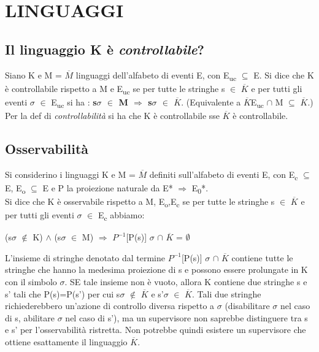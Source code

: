 \documentclass[a4paper]{article}
\begin{document}
\section{LINGUAGGI}
\subsection{Il linguaggio K è \emph{controllabile}?}
Siano K e M = $\overline{M}$ linguaggi dell'alfabeto di eventi E, con E\textsubscript{uc} $\subseteq$ E. Si dice che K è controllabile rispetto a M e E\textsubscript{uc} se per tutte le stringhe s $\in$ $\overline{K}$ e per tutti gli eventi $\sigma$ $\in$ E\textsubscript{uc} si ha : \textbf{s$\sigma$ $\in$ M $\Rightarrow$ s$\sigma$ $\in$ $\overline{K}$}. (Equivalente a $\overline{K}$E\textsubscript{uc} $\cap$ M $\subseteq$ $\overline{K}$.)\\ Per la def di \emph{controllabilità} si ha che K è controllabile sse $\overline{K}$ è controllabile.
\subsection{Osservabilità}
Si considerino i linguaggi K e M = $\overline{M}$ definiti sull'alfabeto di eventi E, con E\textsubscript{c} $\subseteq$ E, E\textsubscript{o} $\subseteq$ E e P la proiezione naturale da E* $\Rightarrow$ E\textsubscript{0}*.\\ Si dice che K è osservabile rispetto a M, E\textsubscript{o},E\textsubscript{c} se per tutte le stringhe s $\in$ $\overline{K}$ e per tutti gli eventi $\sigma$ $\in$ E\textsubscript{c} abbiamo: 
\begin{center}(s$\sigma$ $\notin$ K) $\land$ (s$\sigma$ $\in$ M) $\Rightarrow$ $P^{-1}$[P(s)] $\sigma$  $\cap$ $\overline{K}$ = $\emptyset$
\end{center}
L'insieme di stringhe denotato dal termine $P^{-1}$[P(s)] $\sigma$  $\cap$ $\overline{K}$ contiene tutte le stringhe che hanno la medesima proiezione di s e possono essere prolungate in K con il simbolo $\sigma$. SE tale insieme non è vuoto, allora K contiene due stringhe s e s' tali che P(s)=P(s') per cui s$\sigma$ $\notin$ $\overline{K}$ e s'$\sigma$ $\in$ $\overline{K}$. Tali due stringhe richiederebbero un'azione di controllo diversa rispetto a $\sigma$ (disabilitare $\sigma$ nel caso di s, abilitare $\sigma$ nel caso di s'), ma un supervisore non saprebbe distinguere tra s e s' per l'osservabilità ristretta. Non potrebbe quindi esistere un supervisore che ottiene esattamente il linguaggio $\overline{K}$.
\end{document}
